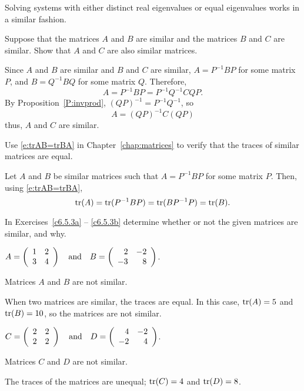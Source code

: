\documentclass{ximera}
\begin{document}
Solving systems with either distinct real eigenvalues or equal eigenvalues
works in a similar fashion.

\EXER

\TEXER

\begin{exercise} \label{c6.5.1}
Suppose that the matrices $A$ and $B$ are similar and the matrices
$B$ and $C$ are similar.  Show that $A$ and $C$ are also similar
matrices.

\begin{solution}

Since $A$ and $B$ are similar and $B$ and $C$ are similar,
$A = P^{-1}BP$ for some matrix $P$, and $B = Q^{-1}BQ$
for some matrix $Q$.  Therefore,
\[ A = P^{-1}BP = P^{-1}Q^{-1}CQP. \]
By Proposition~\ref{P:invprod}, $(QP)^{-1} = P^{-1}Q^{-1}$, so
\[ A = (QP)^{-1}C(QP) \]
thus, $A$ and $C$ are similar.

\end{solution}
\end{exercise}

\begin{exercise} \label{c6.5.2}
Use \eqref{e:trAB=trBA} in Chapter~\ref{chap:matrices} to verify that the
traces of similar matrices are equal.

\begin{solution}

Let $A$ and $B$ be similar matrices such that $A = P^{-1}BP$ for some
matrix $P$.  Then, using \eqref{e:trAB=trBA},
\[ {\rm tr}(A) = {\rm tr}(P^{-1}BP) = {\rm tr}(BP^{-1}P) = {\rm tr}(B). \]

\end{solution}
\end{exercise}

\noindent In Exercises~\ref{c6.5.3a} -- \ref{c6.5.3b} determine whether
or not the given matrices are similar, and why.
\begin{exercise} \label{c6.5.3a}
$A = \left(\begin{array}{rr} 1 & 2\\ 3 &4\end{array}\right) \quad\mbox{and}\quad B = \left(\begin{array}{rr} 2 & -2\\ -3 &8\end{array}\right)$.

\begin{solution}

\ans Matrices $A$ and $B$ are not similar.

\soln When two matrices are similar, the traces are equal.  In this case,
${\rm tr}(A) = 5$ and ${\rm tr}(B) = 10$, so the matrices are not similar.

\end{solution}
\end{exercise}
\begin{exercise} \label{c6.5.3b}
$C = \left(\begin{array}{rr} 2 & 2\\ 2 &2\end{array}\right) \quad\mbox{and}\quad D = \left(\begin{array}{rr} 4 & -2\\ -2 &4\end{array}\right)$.

\begin{solution}

\ans Matrices $C$ and $D$ are not similar.

\soln The traces of the matrices are unequal; ${\rm tr}(C) = 4$ and
${\rm tr}(D) = 8$.

\end{solution}
\end{exercise}
\end{document}

